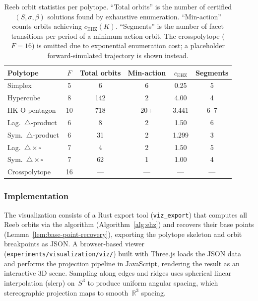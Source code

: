 \begin{table}[ht]
\centering
\begin{tabular}{lccccc}
\toprule
Polytope & $F$ & Total orbits & Min-action & $c_\mathrm{EHZ}$ & Segments \\
\midrule
Simplex                       & 5  & 6    & 6    & 0.25   & 5 \\
Hypercube                     & 8  & 142  & 2    & 4.00   & 4 \\
HK-O pentagon                 & 10 & 718  & 20+  & 3.441  & 6--7 \\
Lag.\ $\triangle$-product     & 6  & 8    & 2    & 1.50   & 6 \\
Sym.\ $\triangle$-product     & 6  & 31   & 2    & 1.299  & 3 \\
Lag.\ $\triangle \times \square$ & 7 & 4  & 2    & 1.50   & 5 \\
Sym.\ $\triangle \times \square$ & 7 & 62 & 1    & 1.00   & 4 \\
Crosspolytope                 & 16 & ---  & ---  & ---    & --- \\
\bottomrule
\end{tabular}
\caption{Reeb orbit statistics per polytope.
  ``Total orbits'' is the number of certified $(S, \sigma, \beta)$
  solutions found by exhaustive enumeration.
  ``Min-action'' counts orbits achieving $c_\mathrm{EHZ}(K)$.
  ``Segments'' is the number of facet transitions per period
  of a minimum-action orbit.
  The crosspolytope ($F = 16$) is omitted due to exponential
  enumeration cost; a placeholder forward-simulated trajectory
  is shown instead.}
\label{tab:viz-orbits}
\end{table}

\subsubsection*{Implementation}

The visualization consists of a Rust export tool
(\texttt{viz\_export}) that computes all Reeb orbits via
the algorithm (Algorithm~\ref{alg:ehz}) and recovers their
base points (Lemma~\ref{lem:base-point-recovery}),
exporting the polytope skeleton and orbit breakpoints as JSON.
A browser-based viewer
(\texttt{experiments/\allowbreak visualization/\allowbreak viz/})
built with Three.js loads the JSON data and performs the
projection pipeline in JavaScript, rendering the result as an
interactive 3D scene.
Sampling along edges and ridges uses spherical linear interpolation
(slerp) on~$S^3$ to produce uniform angular spacing, which
stereographic projection maps to smooth~$\mathbb{R}^3$ spacing.

